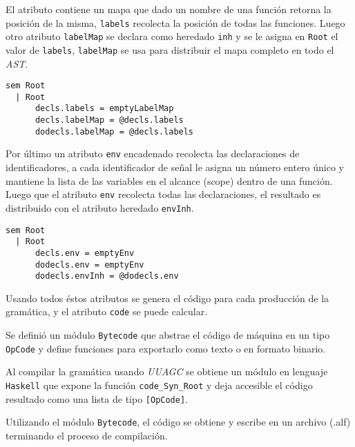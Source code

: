   El atributo contiene un mapa que dado un nombre de una función retorna
  la posición de la misma, \texttt{labels} recolecta la posición de todas
  las funciones.
  Luego otro atributo \texttt{labelMap} se declara como heredado \texttt{inh}
  y se le asigna en \texttt{Root} el valor de \texttt{labels},
  \texttt{labelMap} se usa para distribuir el mapa
  completo en todo el \textit{AST}.

\begin{Verbatim}
sem Root
  | Root
      decls.labels = emptyLabelMap
      decls.labelMap = @decls.labels
      dodecls.labelMap = @decls.labels
\end{Verbatim}

  Por último un atributo \texttt{env} encadenado recolecta las declaraciones
  de identificadores, a cada identificador de señal le asigna un número
  entero único y mantiene la lista de las variables en el alcance (scope)
  dentro de una función. 
  Luego que el atributo \texttt{env} recolecta todas las declaraciones,
  el resultado es distribuido con el atributo heredado \texttt{envInh}.

\begin{Verbatim}
sem Root
  | Root
      decls.env = emptyEnv
      dodecls.env = emptyEnv
      dodecls.envInh = @dodecls.env
\end{Verbatim}

  Usando todos éstos atributos se genera el código para cada producción
  de la gramática, y el atributo \texttt{code} se puede calcular.

  Se definió un módulo \texttt{Bytecode} que abstrae el código
  de máquina en un tipo \texttt{OpCode} y define funciones para 
  exportarlo como texto o en formato binario.

  Al compilar la gramática usando \textit{UUAGC} se obtiene un módulo
  en lenguaje \texttt{Haskell} que expone la función \texttt{code\_Syn\_Root}
  y deja accesible el código resultado como una lista de
  tipo \texttt{[OpCode]}.

  Utilizando el módulo \texttt{Bytecode}, el código se obtiene y 
  escribe en un archivo (.alf) terminando el proceso de compilación.

